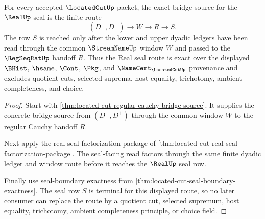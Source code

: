 \begin{theorem}
\label{thm:located-cut-real-seal-bridge-exactness}
For every accepted $\LocatedCutUp$ packet, the exact bridge source for the $\RealUp$ seal is the finite route
$$
(D^{-},D^{+}) \longrightarrow W \longrightarrow R \longrightarrow S .
$$
The row $S$ is reached only after the lower and upper dyadic ledgers have been read through the common $\StreamNameUp$ window $W$ and passed to the $\RegSeqRatUp$ handoff $R$. Thus the Real seal route is exact over the displayed $\BHist$, $\hsame$, $\Cont$, $\Pkg$, and $\NameCert_{\LocatedCutUp}$ provenance and excludes quotient cuts, selected suprema, host equality, trichotomy, ambient completeness, and choice.
\end{theorem}
\begin{proof}
Start with \autoref{thm:located-cut-regular-cauchy-bridge-source}. It supplies the concrete bridge source from $(D^{-},D^{+})$ through the common window $W$ to the regular Cauchy handoff $R$.

Next apply the real seal factorization package of \autoref{thm:located-cut-real-seal-factorization-package}. The seal-facing read factors through the same finite dyadic ledger and window route before it reaches the $\RealUp$ seal row.

Finally use seal-boundary exactness from \autoref{thm:located-cut-seal-boundary-exactness}. The seal row $S$ is terminal for this displayed route, so no later consumer can replace the route by a quotient cut, selected supremum, host equality, trichotomy, ambient completeness principle, or choice field.
\end{proof}

